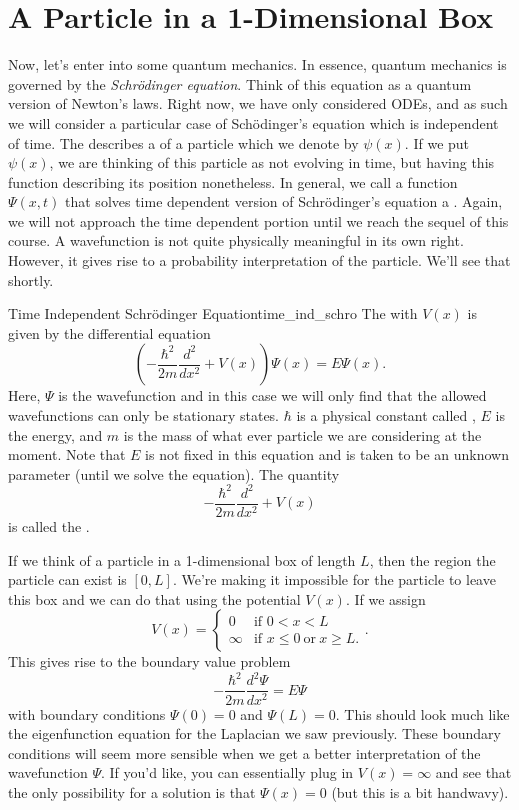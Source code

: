 \section{A Particle in a 1-Dimensional Box}

Now, let's enter into some quantum mechanics.  In essence, quantum mechanics is governed by the \emph{Schr\"odinger equation}.  Think of this equation as a quantum version of Newton's laws.  Right now, we have only considered ODEs, and as such we will consider a particular case of Sch\"odinger's equation which is independent of time. The  describes a  of a particle which we denote by $\psi(x)$.  If we put $\psi(x)$, we are thinking of this particle as not evolving in time, but having this function describing its position nonetheless.  In general, we call a function $\Psi(x,t)$ that solves time dependent version of Schr\"odinger's equation a . Again, we will not approach the time dependent portion until we reach the sequel of this course.  A wavefunction is not quite physically meaningful in its own right.  However, it gives rise to a probability interpretation of the particle. We'll see that shortly.

\begin{df}{Time Independent Schr\"odinger Equation}{time_ind_schro}
The  with  $V(x)$ is given by the differential equation
\[
\left(-\frac{\hbar^2}{2m}\frac{d^2}{dx^2}+V(x)\right)\Psi(x)=E\Psi(x).
\]
Here, $\Psi$ is the wavefunction and in this case we will only find that the allowed wavefunctions can only be stationary states. $\hbar$ is a physical constant called , $E$ is the energy, and $m$ is the mass of what ever particle we are considering at the moment. Note that $E$ is not fixed in this equation and is taken to be an unknown parameter (until we solve the equation). The quantity
\[
-\frac{\hbar^2}{2m}\frac{d^2}{dx^2}+V(x)
\]
is called the .
\end{df}

If we think of a particle in a 1-dimensional box of length $L$, then the region the particle can exist is $[0,L]$.  We're making it impossible for the particle to leave this box and we can do that using the potential $V(x)$. If we assign
\[
V(x)=\begin{cases} 0 & \textrm{if } 0<x<L\\
\infty & \textrm{if } x\leq 0 ~\textrm{or}~ x\geq L. \end{cases}.
\]
This gives rise to the boundary value problem
\[
-\frac{\hbar^2}{2m}\frac{d^2\Psi}{dx^2}=E\Psi
\]
with boundary conditions $\Psi(0)=0$ and $\Psi(L)=0$. This should look much like the eigenfunction equation for the Laplacian we saw previously. These boundary conditions will seem more sensible when we get a better interpretation of the wavefunction $\Psi$. If you'd like, you can essentially plug in $V(x)=\infty$ and see that the only possibility for a solution is that $\Psi(x)=0$ (but this is a bit handwavy). 

